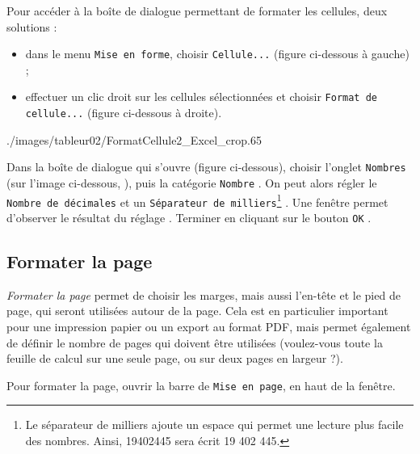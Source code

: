 
Pour accéder à la boîte de dialogue permettant de formater les cellules, deux solutions :
\begin{itemize}
\item dans le menu \texttt{Mise en forme}, choisir \texttt{Cellule...} (figure ci-dessous à gauche) ;    
\item effectuer un clic droit sur les cellules sélectionnées et choisir \texttt{Format de cellule...} (figure ci-dessous à droite).
\end{itemize}

%  
              {./images/tableur02/FormatCellule2_Excel_crop}{.65\textwidth}

Dans la boîte de dialogue qui s'ouvre (figure ci-dessous), choisir l'onglet \texttt{Nombres} (sur l'image ci-dessous, ), puis la catégorie \texttt{Nombre} . On peut alors régler le \texttt{Nombre de décimales}  et un \texttt{Séparateur de milliers}\footnote{Le séparateur de milliers ajoute un espace qui permet une lecture plus facile des nombres. Ainsi, 19402445 sera écrit 19 402 445.} . Une fenêtre permet d'observer le résultat du réglage . Terminer en cliquant sur le bouton \texttt{OK} .              




\subsection{Formater la page}\label{Calc2FormaterPage} 

\emph{Formater la page} permet de choisir les marges, mais aussi l'en-tête et le pied de page, qui seront utilisées autour de la page. Cela est en particulier important pour une impression papier ou un export au format PDF, mais permet également de définir le nombre de pages qui doivent être utilisées (voulez-vous toute la feuille de calcul sur une seule page, ou sur deux pages en largeur ?).

\vspace{12pt}

Pour formater la page, ouvrir la barre de \texttt{Mise en page}, en haut de la fenêtre. 

